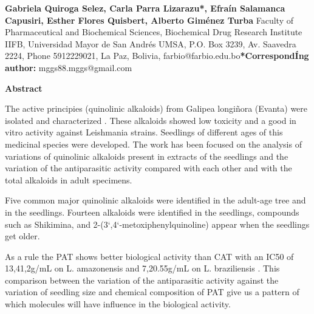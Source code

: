 \documentclass{article}
\begin{document}
\begin{Center}

\end{Center}

\begin{Center}

\end{Center}

\begin{Center}
\textbf{Gabriela Quiroga Selez, Carla Parra Lizarazu*, Efraín Salamanca
Capusiri, Esther Flores Quisbert, Alberto Giménez Turba }
Faculty of Pharmaceutical and Biochemical Sciences, Biochemical Drug Research
Institute IIFB, Universidad Mayor de San Andrés UMSA, P.O. Box 3239, Av.
Saavedra 2224, Phone 5912229021, La Paz, Bolivia,
farbio@farbio.edu.bo\textbf{*CorrespondÍng author:}
mggs88.mggs@gmail.com
\end{Center}

\begin{Center}

\end{Center}

\begin{Center}

\end{Center}

\textbf{Abstract}

The active principies (quinolinic alkaloids) from Galipea longiñora (Evanta)
were isolated and characterized . These alkaloids showed low toxicity and a good
in vitro activity against Leishmania strains. Seedlings of different ages of
this medicinal species were developed. The work has been focused on the analysis
of variations of quinolinic alkaloids present in extracts of the seedlings and
the variation of the antiparasitic activity compared with each other and with
the total alkaloids in adult specimens.

Five common major quinolinic alkaloids were identified in the adult-age tree and
in the seedlings. Fourteen alkaloids were identified in the seedlings, compounds
such as Shikimina, and 2-(3`,4`-metoxiphenylquinoline) appear when the seedlings
get older.

As a rule the PAT shows better biological activity than CAT with an IC50 of
13,41,2g/mL on L. amazonensis and 7,20.55g/mL on L. braziliensis . This
comparison between the variation of the antiparasitic activity against the
variation of seedling size and chemical composition of PAT give us a pattern of
which molecules will have influence in the biological activity.
\end{document}

